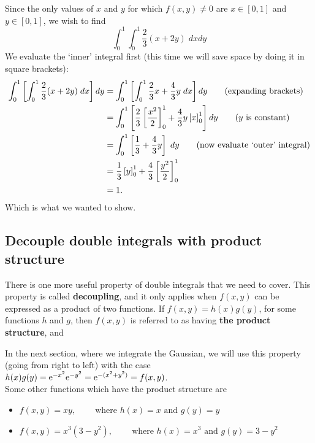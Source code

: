 \solution
Since the only values of $x$ and $y$ for which $f(x,y) \neq 0$ are $x \in [0,1]$ and $y \in [0,1]$, we wish to find
\[
\int_0^1 \int_0^1 \frac{2}{3}(x + 2y) \; dxdy
\]
We evaluate the `inner' integral first (this time we will save space by doing it in square brackets):
\begin{align*}
\int_0^1 \left[\int_0^1 \frac{2}{3}(x + 2y) \; dx\right] dy & = \int_0^1 \left[\int_0^1 \frac{2}{3}x + \frac{4}{3}y \; dx\right] dy \tag{expanding brackets} \\
	& = \int_0^1 \left[\frac{2}{3}\left[\frac{x^2}{2}\right]_0^1 + \frac{4}{3}y\left[x\right]_0^1\right] dy \tag{$y$ is constant} \\
	& = \int_0^1  \left[\frac{1}{3} + \frac{4}{3}y\right] \; dy \tag{now evaluate `outer' integral} \\
	& = \frac{1}{3}\left[y\right]^1_0 + \frac{4}{3}\left[\frac{y^2}{2}\right]^1_0 \\
	& = 1.
\end{align*} 
Which is what we wanted to show. 


\subsection{Decouple double integrals with product structure} \label{decouple} \label{product structure}
There is one more useful property of double integrals that we need to cover. This property is called \textbf{decoupling}, and it only applies when $f(x,y)$ can be expressed as a product of two functions. If $f(x,y) = h(x)g(y)$, for some functions $h$ and $g$, then $f(x,y)$ is referred to as having \textbf{the product structure}, and

  	\bigskip
	
	\hfil{}
	\bigskip
	\bigskip

\noindent In the next section, where we integrate the Gaussian, we will use this property (going from right to left) with the case $h(x)g(y)  = \mathrm{e}^{-x^2}\mathrm{e}^{-y^2} = \mathrm{e}^{-(x^2+y^2)} = f(x,y)$. \\

\noindent Some other functions which have the product structure are
\begin{itemize}
\item $f(x,y) = xy, \;\;\;\;\;\;\;\; \text{where $h(x) = x$ and $g(y) = y$}$
\item $f(x,y) = x^3(3-y^2), \;\;\;\;\;\;\;\; \text{where $h(x) = x^3$ and $g(y) = 3-y^2$}$
\end{itemize}

